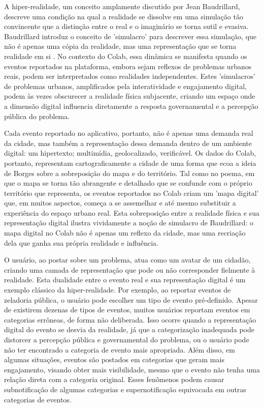 A hiper-realidade, um conceito amplamente discutido por Jean Baudrillard, descreve uma condição na qual a realidade se dissolve em uma simulação tão convincente que a distinção entre o real e o imaginário se torna sutil e evasiva. Baudrillard introduz o conceito de 'simulacro' para descrever essa simulação, que não é apenas uma cópia da realidade, mas uma representação que se torna realidade em si \cite{1994_Baudrillard_BOOK}. No contexto do Colab, essa dinâmica se manifesta quando os eventos reportados na plataforma, embora sejam reflexos de problemas urbanos reais, podem ser interpretados como realidades independentes. Estes 'simulacros' de problemas urbanos, amplificados pela interatividade e engajamento digital, podem às vezes obscurecer a realidade física subjacente, criando um espaço onde a dimensão digital influencia diretamente a resposta governamental e a percepção pública do problema.

Cada evento reportado no aplicativo, portanto, não é apenas uma demanda real da cidade, mas também a representação dessa demanda dentro de um ambiente digital: um hipertexto; multimídia, geolocalizado, verificável. Os dados do Colab, portanto, representam cartograficamente a cidade de uma forma que ecoa a ideia de Borges sobre a sobreposição do mapa e do território. Tal como no poema, em que o mapa se torna tão abrangente e detalhado que se confunde com o próprio território que representa, os eventos reportados no Colab criam um 'mapa digital' que, em muitos aspectos, começa a se assemelhar e até mesmo substituir a experiência do espaço urbano real. Esta sobreposição entre a realidade física e sua representação digital ilustra vividamente a noção de simulacro de Baudrillard: o mapa digital no Colab não é apenas um reflexo da cidade, mas uma recriação dela que ganha sua própria realidade e influência.

O usuário, ao postar sobre um problema, atua como um avatar de um cidadão, criando uma camada de representação que pode ou não corresponder fielmente à realidade. Esta dualidade entre o evento real e sua representação digital é um exemplo clássico da hiper-realidade. Por exemplo, ao reportar eventos de zeladoria pública, o usuário pode escolher um tipo de evento pré-definido. Apesar de existirem dezenas de tipos de eventos, muitos usuários reportam eventos em categorias errôneas, de forma não deliberada. Isso ocorre quando a representação digital do evento se desvia da realidade, já que a categorização inadequada pode distorcer a percepção pública e governamental do problema, ou o usuário pode não ter encontrado a categoria de evento mais apropriada. Além disso, em algumas situações, eventos são postados em categorias que geram mais engajamento, visando obter mais visibilidade, mesmo que o evento não tenha uma relação direta com a categoria original. Esses fenômenos podem causar subnotificação de algumas categorias e supernotificação equivocada em outras categorias de eventos.

